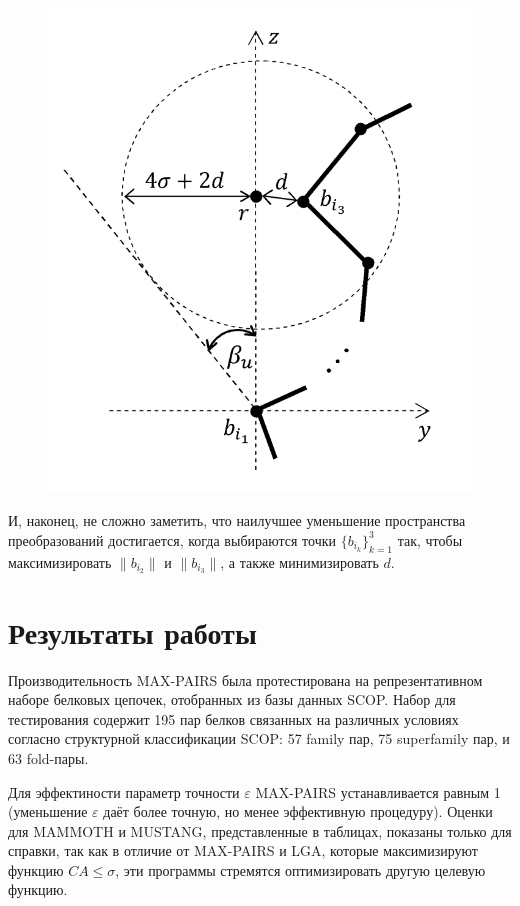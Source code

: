 \documentclass[a4paper]{extreport}
\newcommand{\eps}{\varepsilon}
\begin{document}
\begin{figure}
\caption{}
\includegraphics[scale=1.9]{../pictures/pic2.png}
\end{figure}

И, наконец, не сложно заметить, что наилучшее уменьшение пространства преобразований достигается, когда выбираются точки $\{b_{i_k}\}_{k = 1}^3$ так, чтобы максимизировать $\|b_{i_2}\|$ и $\|b_{i_3}\|$, а также минимизировать $d$.

\section{ Результаты работы}

Производительность MAX-PAIRS была протестирована на репрезентативном наборе белковых цепочек, отобранных из базы данных SCOP. Набор для тестирования содержит 195 пар белков связанных на различных условиях согласно структурной классификации SCOP: 57 family пар, 75 superfamily пар, и 63 fold-пары.

Для эффектиности параметр точности $\eps$ MAX-PAIRS устанавливается равным 1 (уменьшение $\eps$ даёт более точную, но менее эффективную процедуру). Оценки для MAMMOTH и MUSTANG, представленные в таблицах, показаны только для справки, так как в отличие от MAX-PAIRS и LGA, которые максимизируют функцию $CA \leq \sigma$, эти программы стремятся оптимизировать другую целевую функцию.
\end{document}
